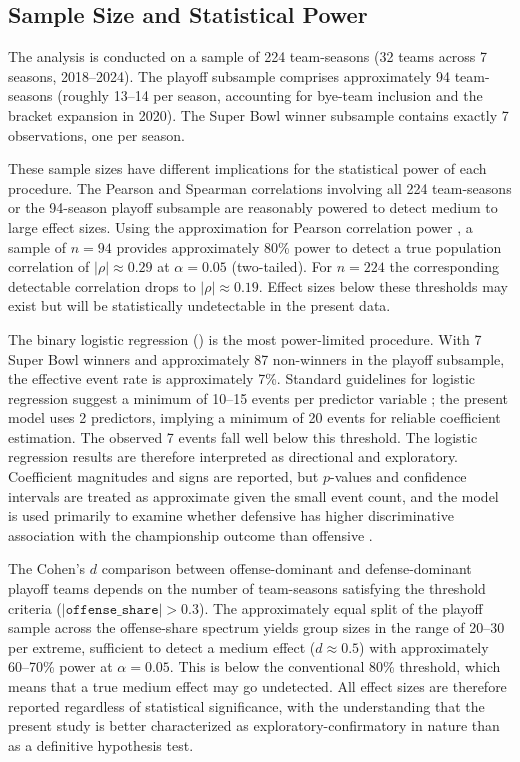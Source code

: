 \subsection{Sample Size and Statistical Power}
\label{sec:sample-size}

The analysis is conducted on a sample of 224 team-seasons (32 teams across
7 seasons, 2018--2024). The playoff subsample comprises approximately 94
team-seasons (roughly 13--14 per season, accounting for bye-team inclusion
and the bracket expansion in 2020). The Super Bowl winner subsample contains
exactly 7 observations, one per season.

These sample sizes have different implications for the statistical power of each
procedure. The Pearson and Spearman correlations involving all 224 team-seasons
or the 94-season playoff subsample are reasonably powered to detect medium to
large effect sizes. Using the approximation for Pearson correlation power
\parencite{cohen1988statisticalpower}, a sample of $n = 94$ provides
approximately 80\% power to detect a true population correlation of
$|\rho| \approx 0.29$ at $\alpha = 0.05$ (two-tailed). For $n = 224$ the
corresponding detectable correlation drops to $|\rho| \approx 0.19$.
Effect sizes below these thresholds may exist but will be statistically
undetectable in the present data.

The binary logistic regression () is the most power-limited
procedure. With 7 Super Bowl winners and approximately 87 non-winners in the
playoff subsample, the effective event rate is approximately 7\%. Standard
guidelines for logistic regression suggest a minimum of 10--15 events per
predictor variable \parencite{hosmer2013logistic}; the present model uses 2
predictors, implying a minimum of 20 events for reliable coefficient estimation.
The observed 7 events fall well below this threshold. The logistic regression
results are therefore interpreted as directional and exploratory. Coefficient
magnitudes and signs are reported, but $p$-values and confidence intervals are
treated as approximate given the small event count, and the model is used
primarily to examine whether defensive \xvoa{} has higher discriminative
association with the championship outcome than offensive \xvoa{}.

The Cohen's $d$ comparison between offense-dominant and defense-dominant
playoff teams depends on the number of team-seasons satisfying the threshold
criteria ($|\texttt{offense\_share}| > 0.3$). The approximately equal split
of the playoff sample across the offense-share spectrum yields group sizes in
the range of 20--30 per extreme, sufficient to detect a medium effect
($d \approx 0.5$) with approximately 60--70\% power at $\alpha = 0.05$.
This is below the conventional 80\% threshold, which means that a true medium
effect may go undetected. All effect sizes are therefore reported regardless
of statistical significance, with the understanding that the present study is
better characterized as exploratory-confirmatory in nature than as a
definitive hypothesis test.

